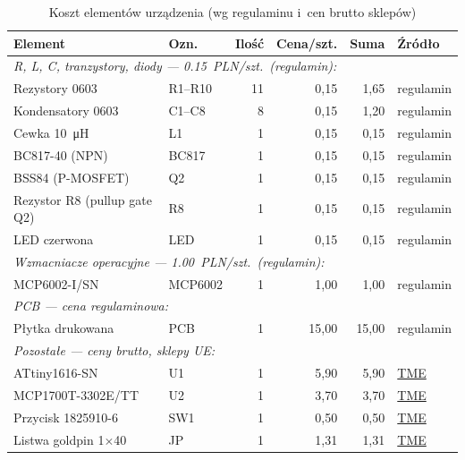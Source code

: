 \documentclass[a4paper,11pt]{article}
\begin{document}
	\begin{table}[H]
		\centering
		\caption{Koszt elementów urządzenia (wg regulaminu i~cen brutto sklepów)}
		\label{tab:koszty}
		\begin{tabularx}{\textwidth}{l l r r r X}
			\toprule
			\textbf{Element} & \textbf{Ozn.} & \textbf{Ilość} &
			\textbf{Cena/szt.} & \textbf{Suma} & \textbf{Źródło} \\
			\midrule
			\multicolumn{6}{l}{\textit{R, L, C, tranzystory, diody --- \SI{0,15}{PLN}/szt.\ (regulamin):}} \\
			\midrule
			Rezystory 0603 & R1--R10 & 11 & 0,15 & 1,65 & regulamin \\
			Kondensatory 0603 & C1--C8 & 8 & 0,15 & 1,20 & regulamin \\
			Cewka \SI{10}{\micro\henry} & L1 & 1 & 0,15 & 0,15 & regulamin \\
			BC817-40 (NPN) & BC817 & 1 & 0,15 & 0,15 & regulamin \\
			BSS84 (P-MOSFET) & Q2 & 1 & 0,15 & 0,15 & regulamin \\
			Rezystor R8 (pullup gate Q2) & R8 & 1 & 0,15 & 0,15 & regulamin \\
			LED czerwona & LED & 1 & 0,15 & 0,15 & regulamin \\
			\midrule
			\multicolumn{6}{l}{\textit{Wzmacniacze operacyjne --- \SI{1,00}{PLN}/szt.\ (regulamin):}} \\
			\midrule
			MCP6002-I/SN & MCP6002 & 1 & 1,00 & 1,00 & regulamin \\
			\midrule
			\multicolumn{6}{l}{\textit{PCB --- cena regulaminowa:}} \\
			\midrule
			Płytka drukowana & PCB & 1 & 15,00 & 15,00 & regulamin \\
			\midrule
			\multicolumn{6}{l}{\textit{Pozostałe --- ceny brutto, sklepy UE:}} \\
			\midrule
			ATtiny1616-SN & U1 & 1 & 5,90 & 5,90 &
			\href{https://www.tme.eu/pl/details/attiny1616-sn/rodzina-avr-8-bit/microchip-technology/}{TME} \\
			MCP1700T-3302E/TT & U2 & 1 & 3,70 & 3,70 &
			\href{https://www.tme.eu/pl/details/mcp1700t-3302e_tt/stabilizatory-ldo-nienastawne/microchip-technology/}{TME} \\
			Przycisk 1825910-6 & SW1 & 1 & 0,50 & 0,50 &
			\href{https://www.tme.eu/pl/details/1825910-6/przelaczniki-tact/te-connectivity/}{TME} \\
			Listwa goldpin 1$\times$40 & JP & 1 & 1,31 & 1,31 &
			\href{https://www.tme.eu/pl/details/zl201-40g/listwy-i-gniazda-kolkowe/connfly/ds1021-1-40sf11-b/}{TME} \\

\end{tabularx}
\end{table}
\end{document}
